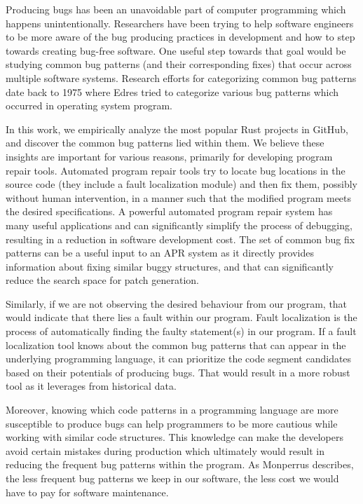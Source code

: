 
Producing bugs has been an unavoidable part of computer programming which happens unintentionally. Researchers have been trying to help software engineers to be more aware of the bug producing practices in development and how to step towards creating bug-free software. One useful step towards that goal would be studying common bug patterns (and their corresponding fixes) that occur across multiple software systems. Research efforts for categorizing common bug patterns date back to 1975 where Edres tried to categorize various bug patterns which occurred in operating system program. 

In this work, we empirically analyze the most popular Rust projects in GitHub, and discover the common bug patterns lied within them. We believe these insights are important for various reasons, primarily for developing program repair tools. Automated program repair tools try to locate bug
locations in the source code (they include a fault localization module) and then fix them, possibly without human intervention, in a manner such that the modified program meets the desired specifications. A powerful automated program repair system has many useful applications and can significantly simplify the process of debugging, resulting in a reduction in software development cost. The set of common bug fix patterns can be a useful input to an APR system as it directly provides information about fixing similar buggy structures, and that can significantly reduce the search space for patch generation. 

Similarly, if we are not observing the desired behaviour from our program, that would indicate that there lies a fault within our program. Fault localization is the process of automatically finding the faulty statement(s) in our program. If a fault localization tool knows about the common bug patterns that can appear in the underlying programming language, it can prioritize the code segment candidates based on their potentials of producing bugs. That would result in a more robust tool as it leverages from historical data.

Moreover, knowing which code patterns in a programming language are more susceptible to produce bugs can help programmers to be more cautious while working with similar code structures. This knowledge can make the developers avoid certain mistakes during production which ultimately would result in reducing the frequent bug patterns within the program. As Monperrus describes, the less frequent bug patterns we keep in our software, the less cost we would have to pay for software maintenance.

